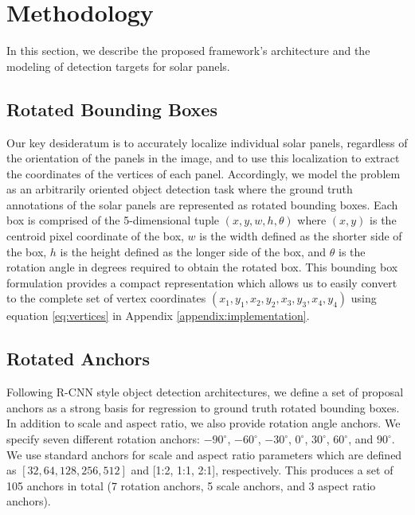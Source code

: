 \section{Methodology}
In this section, we describe the proposed framework's architecture and the modeling of detection targets for solar panels.

\subsection{Rotated Bounding Boxes}
\label{section:bounding_boxes}
Our key desideratum is to accurately localize individual solar panels, regardless of the orientation of the panels in the image, and to use this localization to extract the coordinates of the vertices of each panel. Accordingly, we model the problem as an arbitrarily oriented object detection task where the ground truth annotations of the solar panels are represented as rotated bounding boxes. Each box is comprised of the 5-dimensional tuple $(x, y, w, h, \theta)$ where $(x, y)$ is the centroid pixel coordinate of the box, $w$ is the width defined as the shorter side of the box, $h$ is the height defined as the longer side of the box, and $\theta$ is the rotation angle in degrees required to obtain the rotated box. This bounding box formulation provides a compact representation which allows us to easily convert to the complete set of vertex coordinates $(x_1, y_1, x_2, y_2, x_3, y_3, x_4, y_4)$ using equation \ref{eq:vertices} in Appendix \ref{appendix:implementation}.

\subsection{Rotated Anchors}
Following R-CNN style object detection architectures, we define a set of proposal anchors as a strong basis for regression to ground truth rotated bounding boxes. In addition to scale and aspect ratio, we also provide rotation angle anchors. We specify seven different rotation anchors: $-90^{\circ}$, $-60^{\circ}$, $-30^{\circ}$, $0^{\circ}$, $30^{\circ}$, $60^{\circ}$, and $90^{\circ}$. We use standard anchors for scale and aspect ratio parameters which are defined as $[32, 64, 128, 256, 512]$ and [1:2, 1:1, 2:1], respectively. This produces a set of 105 anchors in total (7 rotation anchors, 5 scale anchors, and 3 aspect ratio anchors).

